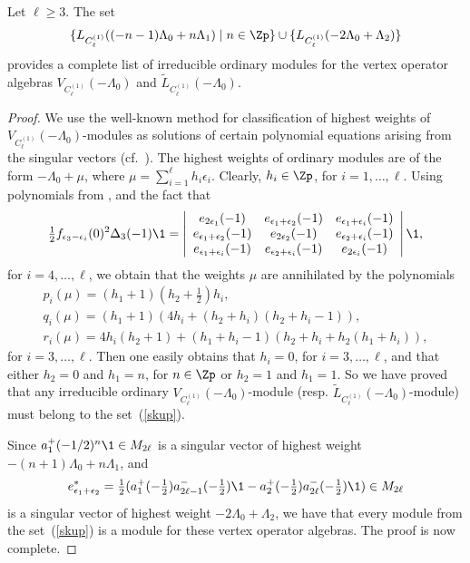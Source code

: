 \documentclass[pdftex]{sigma}
\begin{document}
\begin{proposition} \label{classif-C-0} \sloppy Let $\ell \ge 3$.
The set
\begin{gather} \label{skup}  \{ L_{C_{\ell} ^{(1)}}( (-n-1 ) \Lambda_0 + n
\Lambda_1) \; \vert \; n \in {\Zp} \}  \cup \{ L_{C_{\ell} ^{(1)}}(- 2
\Lambda_0 + \Lambda_2) \}
 \end{gather}
 provides a complete list of irreducible ordinary modules for the vertex operator algebras $V_{C_{\ell} ^{(1)}}
(-\Lambda_0)$ and $\widetilde{L}_{C_{\ell} ^{(1)}} (-\Lambda_0)$.
\end{proposition}

\begin{proof}
We use the well-known method   for classif\/ication of highest weights
of $V_{C_{\ell} ^{(1)}} (-\Lambda_0)$-modules as solutions of
certain polynomial equations arising from the singular vectors (cf.~\cite{A-1994,AM,AP,MP,P2,P1}). The highest weights of ordinary modules are of the form
$- \Lambda_0 + \mu$, where $\mu = \sum\limits_{i=1}^{\ell}h_{i} \epsilon
_{i}$. Clearly, $h_{i} \in \Zp$, for $i=1, \ldots , \ell$. Using
polynomials from \cite[Example~4.1]{A1}, and the fact that
\[
\tfrac{1}{2}f_{\epsilon _{3}- \epsilon _{i}}(0)^2 \Delta_3(-1){\1}=
\left| \begin{array}{ccc} e_{ 2\epsilon_1} (-1) & e_{ \epsilon_1 +
\epsilon_2} (-1) &  e_{ \epsilon_1 + \epsilon_i} (-1)
\\ e_{ \epsilon_1 + \epsilon_2} (-1) & e_{ 2
\epsilon_2} (-1)&  e_{ \epsilon_2 + \epsilon_i} (-1)
\\e_{ \epsilon_1
+ \epsilon_i} (-1) & e_{ \epsilon_2 + \epsilon_i} (-1) & e_{ 2
\epsilon_i} (-1)
\end{array} \right| {\1},
\]
for $i=4, \ldots , \ell$, we obtain that the weights $\mu$ are
annihilated by the polynomials
\begin{gather*}
 p_i( \mu) = (h_1 +1) (h_2 + \tfrac{1}{2}) h_i,  \nonumber \\
 q_i( \mu) = (h_1 +1) ( 4h_i + ( h_2 + h_i) ( h_2 + h_i -1) ),
\nonumber
\\
 r_i( \mu) = 4 h_i ( h_2 +1) + ( h_1 + h_i -1) ( h_2 + h_i + h_2 (
h_1 + h_i)), \nonumber
\end{gather*}
for $i=3, \ldots , \ell$. Then one easily obtains that $h_i=0$, for
$i=3, \ldots , \ell$, and that either $h_2=0$ and $h_1=n$, for $n
\in {\Zp}$ or $h_2=1$ and $h_1=1$. So we have proved that any
irreducible ordinary $V_{C_{\ell} ^{(1)}} (-\Lambda_0)$-module
(resp. $\widetilde{L}_{C_{\ell} ^{(1)}} (-\Lambda_0)$-module) must
belong to the set~(\ref{skup}).

Since $a_1 ^+ (-1/2) ^{n} {\1} \in M_{2 \ell}$ is a singular vector
of highest weight $-(n+1) \Lambda_0 + n \Lambda_1$, and
\[
e_{\epsilon _{1}+ \epsilon _{2}} ^*=\tfrac{1}{2}(a_1 ^+
(-\tfrac{1}{2}) a_{2\ell -1} ^-( -\tfrac{1}{2}){\1} - a_2 ^+
(-\tfrac{1}{2}) a_{2\ell} ^-( -\tfrac{1}{2}) {\1}) \in M_{2 \ell}
\]
is a singular vector of highest weight $-2\Lambda_0 + \Lambda_2$, we
have that every module from the set~(\ref{skup}) is a module for
these vertex operator algebras. The proof is now complete.
\end{proof}
\end{document}
